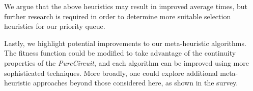 We argue that the above heuristics may result in improved average times, but
further research is required in order to determine more suitable selection heuristics for our priority queue.

Lastly, we highlight potential improvements to our meta-heuristic algorithms. 
The fitness function could be modified to take advantage of the continuity properties of the \textit{PureCircuit}, 
and each algorithm can be improved using more sophisticated techniques. 
More broadly, one could explore additional meta-heuristic approaches 
beyond those considered here, as shown in the survey\cite{abdel-basset_Chapter10Metaheuristic_2018}.

